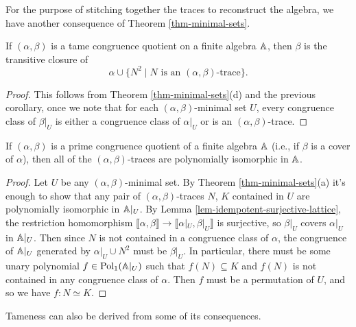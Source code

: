 \begin{appendices}
For the purpose of stitching together the traces to reconstruct the algebra, we have another consequence of Theorem \ref{thm-minimal-sets}.

\begin{cor}\label{cor-trace-closure} If $(\alpha,\beta)$ is a tame congruence quotient on a finite algebra $\mathbb{A}$, then $\beta$ is the transitive closure of
\[
\alpha \cup \{N^2 \mid N \text{ is an }(\alpha,\beta)\text{-trace}\}.
\]
\end{cor}
\begin{proof} This follows from Theorem \ref{thm-minimal-sets}(d) and the previous corollary, once we note that for each $(\alpha,\beta)$-minimal set $U$, every congruence class of $\beta|_U$ is either a congruence class of $\alpha|_U$ or is an $(\alpha,\beta)$-trace.
\end{proof}

\begin{prop}\label{prop-prime-poly-iso} If $(\alpha,\beta)$ is a prime congruence quotient of a finite algebra $\mathbb{A}$ (i.e., if $\beta$ is a cover of $\alpha$), then all of the $(\alpha,\beta)$-traces are polynomially isomorphic in $\mathbb{A}$.
\end{prop}
\begin{proof} Let $U$ be any $(\alpha,\beta)$-minimal set. By Theorem \ref{thm-minimal-sets}(a) it's enough to show that any pair of $(\alpha,\beta)$-traces $N$, $K$ contained in $U$ are polynomially isomorphic in $\mathbb{A}|_U$. By Lemma \ref{lem-idempotent-surjective-lattice}, the restriction homomorphism $\llbracket \alpha, \beta \rrbracket \rightarrow \llbracket \alpha|_U, \beta|_U \rrbracket$ is surjective, so $\beta|_U$ covers $\alpha|_U$ in $\mathbb{A}|_U$. Then since $N$ is not contained in a congruence class of $\alpha$, the congruence of $\mathbb{A}|_U$ generated by $\alpha|_U \cup N^2$ must be $\beta|_U$. In particular, there must be some unary polynomial $f \in \operatorname{Pol}_1(\mathbb{A}|_U)$ such that $f(N) \subseteq K$ and $f(N)$ is not contained in any congruence class of $\alpha$. Then $f$ must be a permutation of $U$, and so we have $f : N \simeq K$.
\end{proof}

Tameness can also be derived from some of its consequences.


\end{appendices}
